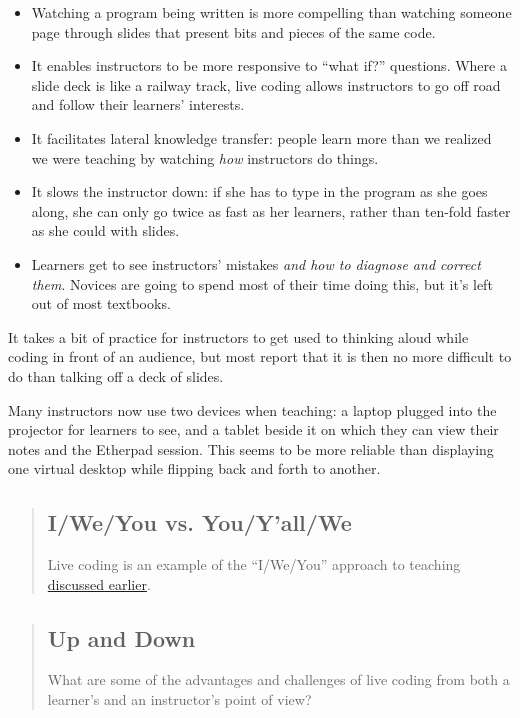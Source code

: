 \begin{itemize}
\item Watching a program being written is more compelling than
watching someone page through slides that present bits and pieces of the same code.
\item It enables instructors to be more responsive to ``what if?'' questions.
Where a slide deck is like a railway track,
live coding allows instructors to go off road and follow their learners' interests.
\item It facilitates lateral knowledge transfer:
people learn more than we realized we were teaching by watching \emph{how} instructors do things.
\item It slows the instructor down:
if she has to type in the program as she goes along,
she can only go twice as fast as her learners,
rather than ten-fold faster as she could with slides.
\item Learners get to see instructors' mistakes \emph{and how to diagnose and correct them}.
Novices are going to spend most of their time doing this,
but it's left out of most textbooks.
\end{itemize}

It takes a bit of practice for instructors to
get used to thinking aloud while coding in front of an audience, but
most report that it is then no more difficult to do than talking off a
deck of slides.

Many instructors now use two devices when teaching: a laptop plugged
into the projector for learners to see, and a tablet beside it on
which they can view their notes and the Etherpad session.
This seems to be more reliable than
displaying one virtual desktop while flipping back and forth to
another.

\begin{quotation}   %
\subsection*{I/We/You vs. You/Y'all/We}

Live coding is an example of the ``I/We/You'' approach to teaching
\href{\{\{ page.root \}\}/05-performance/}{discussed earlier}.
\end{quotation}   %

\begin{quotation}   %
\subsection*{Up and Down}

What are some of the advantages and challenges of live coding
from both a learner's and an instructor's point of view?
\end{quotation}   %


